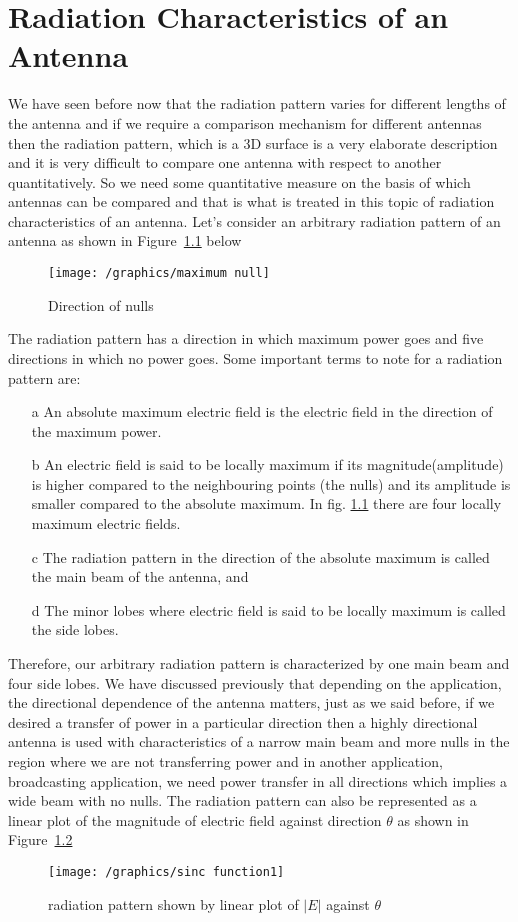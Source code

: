 \chapter{Radiation Characteristics of an Antenna}
We have seen before now that the radiation pattern varies for different lengths of the antenna and if we require a comparison mechanism for different antennas then the radiation pattern, which is a 3D surface is a very elaborate description and it is very difficult to compare one antenna with respect to another quantitatively. So we need some quantitative measure on the basis of which antennas can be compared and that is what is treated in this topic of radiation characteristics of an antenna.
Let's consider an arbitrary radiation pattern of an antenna as shown in Figure~\ref{figure8} below

\begin{figure}[h]
\centering
\texttt{[image: /graphics/maximum null]}
\caption{Direction of nulls}
\label{figure8}
\end{figure}

The radiation pattern has a direction in which maximum power goes and five directions in which no power goes. Some important terms to note for a radiation pattern are:
\begin{enumerate}
\item [a]	An absolute maximum electric field is the electric field in the direction of the maximum power.
\item [b]	An electric field is said to be locally maximum if its magnitude(amplitude) is higher compared to the neighbouring points (the nulls) and its amplitude is smaller compared to the absolute maximum. In fig. \ref{figure8} there are four locally maximum electric fields.
\item [c]	The radiation pattern in the direction of the absolute maximum is called the main beam of the antenna, and
\item [d] 	The minor lobes where electric field is said to be locally maximum is called the side lobes.
\end{enumerate}

Therefore, our arbitrary radiation pattern is characterized by one main beam and four side lobes. We have discussed previously that depending on the application, the directional dependence of the antenna matters, just as we said before, if we desired a transfer of power in a particular direction then a highly directional antenna is used with characteristics of a narrow main beam and more nulls in the region where we are not transferring power and in another application, broadcasting application, we need power transfer in all directions which implies a wide beam with no nulls.
The radiation pattern can also be represented as a linear plot of the magnitude of electric field against direction $\theta$  as shown in Figure~\ref{figure9}
\begin{figure}[h]
\centering
\texttt{[image: /graphics/sinc function1]}
\caption{radiation pattern shown by linear plot of $|E|$ against $\theta$}
\label{figure9}
\end{figure}

